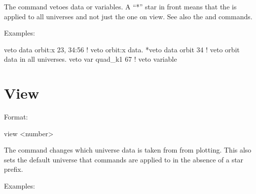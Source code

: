 \vskip 0.2in 
The  command  vetoes data or variables.
A ``*'' star in front means that the  is applied
to all universes and not just the one on view. See also the 
and  commands.

Examples:
\begin{example}
  veto data orbit:x  23, 34:56 ! veto orbit:x data.
  *veto data orbit 34          ! veto orbit data in all universes.
  veto var quad_k1 67     ! veto variable
\end{example}

\section{View}
\label{s:view}

Format:
\begin{example}
  view <number>
\end{example}

\vskip 0.2in The  command changes which universe data is
taken from from plotting.  This also sets the default universe that
commands are applied to in the absence of a star prefix.  

Examples:
